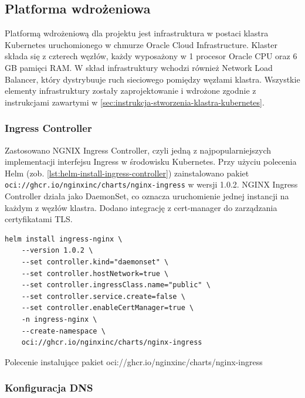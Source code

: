 \subsection{Platforma wdrożeniowa}\label{subsec:platforma-wdrozeniowa-kubernetes}

Platformą wdrożeniową dla projektu jest infrastruktura w postaci klastra Kubernetes uruchomionego w chmurze Oracle Cloud Infrastructure.
Klaster składa się z czterech węzłów, każdy wyposażony w 1 procesor Oracle CPU oraz 6 GB pamięci RAM\@.
W skład infrastruktury wchodzi również Network Load Balancer, który dystrybuuje ruch sieciowego pomiędzy węzłami klastra.
Wszystkie elementy infrastruktury zostały zaprojektowanie i wdrożone zgodnie z instrukcjami zawartymi w \autoref{sec:instrukcja-stworzenia-klastra-kubernetes}.

\subsubsection{Ingress Controller}\label{subsubsec:ingress-controller}

Zastosowano NGNIX Ingress Controller, czyli jedną z najpopularniejszych implementacji interfejsu Ingress w środowisku Kubernetes.
Przy użyciu polecenia Helm (zob. \autoref{lst:helm-install-ingress-controller}) zainstalowano pakiet \texttt{oci://ghcr.io/nginxinc/charts/nginx-ingress} w wersji 1.0.2.
NGINX Ingress Controller działa jako DaemonSet, co oznacza uruchomienie jednej instancji na każdym z węzłów klastra.
Dodano integrację z cert-manager do zarządzania certyfikatami TLS\@.

\begin{listing}[H]
    \begin{verbatim}
helm install ingress-nginx \
    --version 1.0.2 \
    --set controller.kind="daemonset" \
    --set controller.hostNetwork=true \
    --set controller.ingressClass.name="public" \
    --set controller.service.create=false \
    --set controller.enableCertManager=true \
    -n ingress-nginx \
    --create-namespace \
    oci://ghcr.io/nginxinc/charts/nginx-ingress
    \end{verbatim}
    \caption{Polecenie instalujące pakiet oci://ghcr.io/nginxinc/charts/nginx-ingress}
    \label{lst:helm-install-ingress-controller}
\end{listing}

\newpage

\subsubsection{Konfiguracja DNS}\label{subsubsec:konfiguracja-dns}

